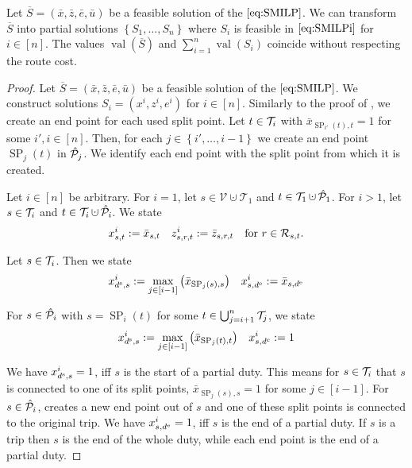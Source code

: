 \begin{theorem}
\label{thm:equivalence_SMILP_heuristic}

Let ${\overline{S}=\left(\bar{x},\bar{z},\bar{e},\bar{u}\right)}$ be a feasible solution of the $\eqref{eq:SMILP}$. We can transform $\overline{S}$ into partial solutions $\left\{S_1,\dots,S_n\right\}$ where $S_i$ is feasible in $\eqref{eq:SMILPi}$ for ${i\in[n]}$. The values $\operatorname{val}(\overline{S})$ and ${\sum_{i=1}^n \operatorname{val}\left(S_i\right)}$ coincide without respecting the route cost.

\end{theorem}

\begin{proof}

Let ${\overline{S}=\left(\bar{x},\bar{z},\bar{e},\bar{u}\right)}$ be a feasible solution of the $\eqref{eq:SMILP}$. We construct solutions ${S_i=\left(x^i,z^i,e^i\right)}$ for ${i\in[n]}$. Similarly to the proof of , we create an end point for each used split point. Let ${t\in\mathcal{T}_i}$ with ${\bar{x}_{\operatorname{SP}_{i'}(t),t}=1}$ for some ${i',i\in[n]}$. Then, for each ${j\in\left\{i',\dots,i-1\right\}}$ we create an end point $\operatorname{SP}_j(t)$ in $\hat{\mathcal{P}}_j$. We identify each end point with the split point from which it is created.

Let ${i\in[n]}$ be arbitrary. For ${i=1}$, let ${s\in\mathcal{V}\cupdot\mathcal{T}_1}$ and ${t\in\mathcal{T}_1\cupdot\Phat_1}$. For ${i>1}$, let ${s\in\mathcal{T}_i}$ and ${t\in\Ti\cupdot\Phat_i}$. We state
\begin{align*}
	x^i_{s,t} := \bar{x}_{s,t} && z^i_{s,r,t} := \bar{z}_{s,r,t} && \text{for } r\in\mathcal{R}_{s,t}.
\end{align*}

Let ${s\in\mathcal{T}_i}$. Then we state
\begin{align*}
	x^i_{d^{\operatorname{s}},s} := \max_{j\in[i-1]} \left(\bar{x}_{\operatorname{SP}_j(s),s}\right) && x^i_{s,d^{\operatorname{e}}} := \bar{x}_{s,d^{\operatorname{e}}}
\end{align*}

For ${s\in\hat{\mathcal{P}}_i}$ with ${s=\operatorname{SP}_i(t)}$ for some ${t\in\bigcup_{j=i+1}^n\mathcal{T}_j}$, we state
\begin{align*}
	x^i_{d^{\operatorname{s}},s} := \max_{j\in[i-1]} \left(\bar{x}_{\operatorname{SP}_j(t),t}\right) && x^i_{s,d^{\operatorname{e}}} := 1
\end{align*}

We have ${x^i_{d^{\operatorname{s}},s}=1}$, iff $s$ is the start of a partial duty. This means for ${s\in\mathcal{T}_i}$ that $s$ is connected to one of its split points, \ie ${\bar{x}_{\operatorname{SP}_j(s),s}=1}$ for some ${j\in[i-1]}$. For ${s\in\hat{\mathcal{P}}_i}$,  creates a new end point out of $s$ and one of these split points is connected to the original trip. We have ${x^i_{s,d^{\operatorname{e}}}=1}$, iff $s$ is the end of a partial duty. If $s$ is a trip then $s$ is the end of the whole duty, while each end point is the end of a partial duty.


\end{proof}
